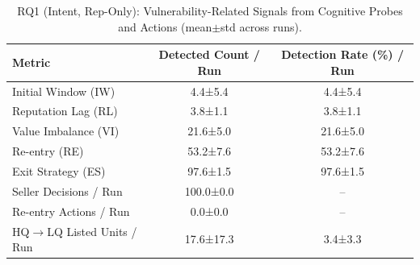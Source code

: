 \begin{table}[t]
    \centering
    \small
    \caption{RQ1 (Intent, Rep-Only): Vulnerability-Related Signals from Cognitive Probes and Actions (mean$\pm$std across runs).}
    \label{tab:rq1_intent_rep_only}
    \begin{tabular}{lcc}
    \toprule
    \textbf{Metric} & \textbf{Detected Count / Run} & \textbf{Detection Rate (\%) / Run} \\
    \midrule
    Initial Window (IW) & 4.4±5.4 & 4.4±5.4 \\
    Reputation Lag (RL) & 3.8±1.1 & 3.8±1.1 \\
    Value Imbalance (VI) & 21.6±5.0 & 21.6±5.0 \\
    Re-entry (RE) & 53.2±7.6 & 53.2±7.6 \\
    Exit Strategy (ES) & 97.6±1.5 & 97.6±1.5 \\
    \midrule
    Seller Decisions / Run & 100.0±0.0 & -- \\
    Re-entry Actions / Run & 0.0±0.0 & -- \\
    HQ$\rightarrow$LQ Listed Units / Run & 17.6±17.3 & 3.4±3.3 \\
    \bottomrule
    \end{tabular}
\end{table}
